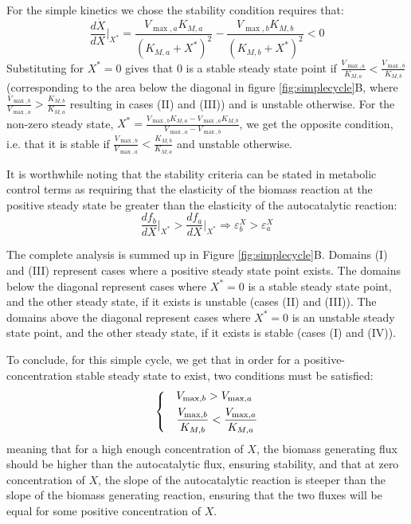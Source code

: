\documentclass[a4page,notitlepage]{article}
\begin{document}
    For the simple kinetics we chose the stability condition requires that:
    \begin{equation*}
      \frac{d\dot X}{dX}\Big\vert_{X^*} = \frac{V_{\max,a}K_{M,a}}{(K_{M,a}+X^*)^2}-\frac{V_{\max,b}K_{M,b}}{(K_{M,b}+X^*)^2}<0
    \end{equation*}
    Substituting for $X^*=0$ gives that $0$ is a stable steady state point if $\frac{V_{\max,a}}{K_{M,a}}<\frac{V_{\max,b}}{K_{M,b}}$ (corresponding to the area below the diagonal in figure \ref{fig:simplecycle}B, where $\frac{V_{\max,b}}{V_{\max,a}}>\frac{K_{M,b}}{K_{M,a}}$ resulting in cases (II) and (III)) and is unstable otherwise.
    For  the non-zero steady state, $X^*=\frac{V_{\max,b}K_{M,a}-V_{\max,a}K_{M,b}}{V_{\max,a}-V_{\max,b}}$, we get the opposite condition, i.e. that it is stable if $\frac{V_{\max,b}}{V_{\max,a}}<\frac{K_{M,b}}{K_{M,a}}$ and unstable otherwise.

    It is worthwhile noting that the stability criteria can be stated in metabolic control terms \cite{Fell1997-bp} as requiring that the elasticity of the biomass reaction at the positive steady state be greater than the elasticity of the autocatalytic reaction:
    \begin{equation*}
      \frac{df_b}{dX}\Big\vert_{X^*}>\frac{df_a}{dX}\Big\vert_{X^*} \Rightarrow \varepsilon^X_b>\varepsilon^X_a
    \end{equation*}
    
    The complete analysis is summed up in Figure \ref{fig:simplecycle}B.
    Domains (I) and (III) represent cases where a positive steady state point exists.
    The domains below the diagonal represent cases where $X^*=0$ is a stable steady state point, and the other steady state, if it exists is unstable (cases (II) and (III)).
    The domains above the diagonal represent cases where $X^*=0$ is an unstable steady state point, and the other steady state, if it exists is stable (cases (I) and (IV)).

    To conclude, for this simple cycle, we get that in order for a positive-concentration stable steady state to exist, two conditions must be satisfied:
    \begin{equation}
    \label{eq:stabconds}
    \begin{dcases}
      & V_{\max,b}>V_{\max,a} \\
      & \frac{V_{\max,b}}{K_{M,b}}<\frac{V_{\max,a}}{K_{M,a}}
    \end{dcases}
    \end{equation}
    meaning that for a high enough concentration of $X$, the biomass generating flux should be higher than the autocatalytic flux, ensuring stability, and that at zero concentration of $X$, the slope of the autocatalytic reaction is steeper than the slope of the biomass generating reaction, ensuring that the two fluxes will be equal for some positive concentration of $X$.
\end{document}
